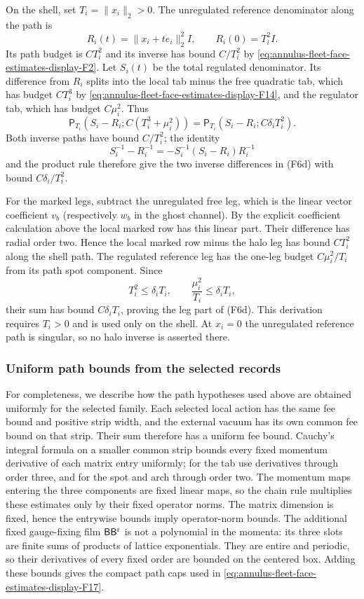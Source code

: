 On the shell, set $T_i=\|x_i\|_2>0$. The unregulated reference
denominator along the path is
\[
 R_i(t)=\|x_i+t e_i\|_2^2 I,
 \qquad R_i(0)=T_i^2I.
\]
Its path budget is $C T_i^2$ and its inverse has bound $C/T_i^2$ by
\eqref{eq:annulus-fleet-face-estimates-display-F2}. Let $S_i(t)$ be the total regulated denominator. Its difference
from $R_i$ splits into the local tab minus the free quadratic tab, which
has budget $C T_i^3$ by \eqref{eq:annulus-fleet-face-estimates-display-F14}, and the regulator tab, which has budget
$C\mu_i^2$. Thus
\[
 \mathsf P_{T_i}(S_i-R_i;C(T_i^3+\mu_i^2))
 =\mathsf P_{T_i}(S_i-R_i;C\delta_iT_i^2).
\]
Both inverse paths have bound $C/T_i^2$; the identity
\[
 S_i^{-1}-R_i^{-1}=-S_i^{-1}(S_i-R_i)R_i^{-1}
\]
and the product rule therefore give the two inverse differences in (F6d)
with bound $C\delta_i/T_i^2$.

For the marked legs, subtract the unregulated free leg, which is the
linear vector coefficient $v_b$ (respectively $w_b$ in the ghost
channel). By the explicit coefficient calculation above the local
marked row has this linear part. Their difference has
radial order two. Hence the local marked row minus the halo leg has
bound $C T_i^2$ along the shell path. The regulated reference leg has
the one-leg budget $C\mu_i^2/T_i$ from its path spot component. Since
\[
 T_i^2\leq\delta_iT_i,
 \qquad \frac{\mu_i^2}{T_i}\leq\delta_iT_i,
\]
their sum has bound $C\delta_iT_i$, proving the leg part of (F6d).
This derivation requires $T_i>0$ and is used only on the shell. At
$x_i=0$ the unregulated reference path is singular, so no halo inverse is
asserted there.

\subsubsection{Uniform path bounds from the selected records}

For completeness, we describe how the path hypotheses used above are
obtained uniformly for the selected family. Each selected local action
has the same fee bound and positive strip width, and the external vacuum
has its own common fee bound on that strip. Their sum therefore has a
uniform fee bound. Cauchy's integral formula on a smaller common strip
bounds every fixed momentum derivative of each matrix entry uniformly;
for the tab use derivatives through order three, and for the spot and
arch through order two. The momentum maps entering the three components
are fixed linear maps, so the chain rule multiplies these estimates only
by their fixed operator norms. The matrix dimension is fixed, hence the
entrywise bounds imply operator-norm bounds. The additional fixed
gauge-fixing film $\mathsf B\mathsf B^{\rm r}$ is not a polynomial in
the momenta: its three slots are finite sums of products of lattice
exponentials. They are entire and periodic, so their derivatives of
every fixed order are bounded on the centered box. Adding these bounds
gives the compact path caps used in \eqref{eq:annulus-fleet-face-estimates-display-F17}.

